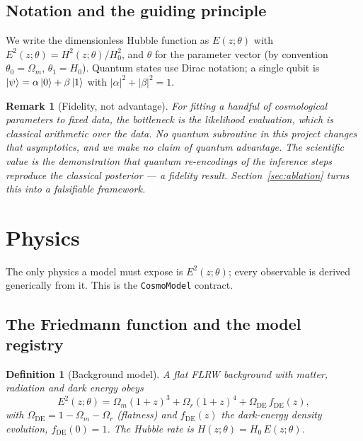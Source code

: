 \documentclass[11pt]{article}
\newtheorem{definition}{Definition}[section]
\newtheorem{remark}{Remark}[section]
\newcommand{\Om}{\Omega_m}
\newcommand{\Or}{\Omega_r}
\newcommand{\ODE}{\Omega_{\mathrm{DE}}}
\newcommand{\Ez}{E(z;\theta)}
\newcommand{\Ezsq}{E^2(z;\theta)}
\newcommand{\code}[1]{\texttt{#1}}
\begin{document}
\subsection{Notation and the guiding principle}

We write the dimensionless Hubble function as $\Ez$ with $\Ezsq =
H^2(z;\theta)/H_0^2$, and $\theta$ for the parameter vector (by convention
$\theta_0=\Om$, $\theta_1=H_0$). Quantum states use Dirac notation; a single
qubit is $\ket{\psi}=\alpha\ket{0}+\beta\ket{1}$ with $|\alpha|^2+|\beta|^2=1$.

\begin{remark}[Fidelity, not advantage]
For fitting a handful of cosmological parameters to fixed data, the bottleneck
is the \emph{likelihood evaluation}, which is classical arithmetic over the
data. No quantum subroutine in this project changes that asymptotics, and we
make no claim of quantum advantage. The scientific value is the demonstration
that quantum re-encodings of the inference steps \emph{reproduce} the
classical posterior --- a fidelity result. Section~\ref{sec:ablation} turns
this into a falsifiable framework.
\end{remark}

\section{Physics}
\label{sec:physics}

The only physics a model must expose is $\Ezsq$; every observable is derived
generically from it. This is the \code{CosmoModel} contract.

\subsection{The Friedmann function and the model registry}

\begin{definition}[Background model]
A flat FLRW background with matter, radiation and dark energy obeys
\begin{equation}
\Ezsq = \Om(1+z)^3 + \Or(1+z)^4 + \ODE\, f_{\mathrm{DE}}(z),
\end{equation}
with $\ODE = 1-\Om-\Or$ (flatness) and $f_{\mathrm{DE}}(z)$ the dark-energy
density evolution, $f_{\mathrm{DE}}(0)=1$. The Hubble rate is
$H(z;\theta)=H_0\,\Ez$.
\end{definition}
\end{document}
